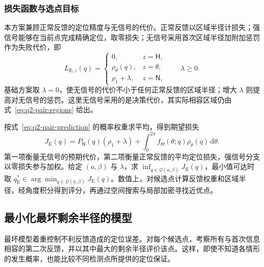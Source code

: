 \documentclass[UTF8,a4paper,zihao=-4,fontset=none]{ctexart}
\begin{document}
\subsubsection{损失函数与选点目标}

本方案兼顾正常反馈的定位精度与无信号的代价。正常反馈以区域半径计损失；强信号能够在当前点完成精确定位，取零损失；无信号采用首次区域半径加附加惩罚作为失败代价，即
\begin{equation}
 L_{\mathrm E,z}(q)=
 \begin{cases}
 0,&z=\mathsf H,\\
 \rho_\theta(q),&z=\theta,\\
 \rho_1+\lambda,&z=\mathsf N,
 \end{cases}
 \qquad \lambda\ge0.
\label{eq:q2-pair-expected-loss}
\end{equation}
基础方案取 \(\lambda=0\)，使无信号的代价不小于任何正常反馈的区域半径；增大 \(\lambda\) 则提高对无信号的惩罚。这里无信号采用的是决策代价，其实际相容区域仍由式~\eqref{eq:q2-pair-regions} 给出。

按式~\eqref{eq:q2-pair-prediction} 的概率权重求平均，得到期望损失
\begin{equation}
 J_{\mathrm E}(q)
 =P_{\mathsf N}(q)(\rho_1+\lambda)
 +\int_0^{2\pi}f_\Theta(\theta;q)\rho_\theta(q)\,\mathrm d\theta.
\label{eq:q2-pair-expected-objective}
\end{equation}
第一项衡量无信号的预期代价，第二项衡量正常反馈的平均定位损失，强信号分支以零损失参与加权。给定 \((a,\beta)\) 与 \(\lambda\)，求 \(\inf_{q\in\mathcal Q(a,\beta)}J_{\mathrm E}(q)\)，最小值可达时取 \(q_{\mathrm E}^*\in\arg\min_{q\in\mathcal Q(a,\beta)}J_{\mathrm E}(q)\)。数值上，对候选点计算反馈权重和区域半径，经角度积分得到评分，再通过空间搜索与局部加密寻找近优点。

\subsection{最小化最坏剩余半径的模型}

最坏模型着重控制不利反馈造成的定位误差。对每个候选点，考察所有与首次信息相容的第二次反馈，并以其中最大的剩余半径评价该点。这样，即使不知道各情形的发生概率，也能比较不同检测点所提供的定位保证。
\end{document}
